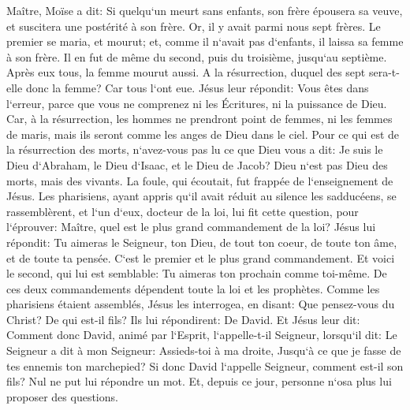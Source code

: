 \verse Maître, Moïse a dit: Si quelqu`un meurt sans enfants, son frère épousera sa veuve, et suscitera une postérité à son frère. 
\verse Or, il y avait parmi nous sept frères. Le premier se maria, et mourut; et, comme il n`avait pas d`enfants, il laissa sa femme à son frère. 
\verse Il en fut de même du second, puis du troisième, jusqu`au septième. 
\verse Après eux tous, la femme mourut aussi. 
\verse A la résurrection, duquel des sept sera-t-elle donc la femme? Car tous l`ont eue. 
\verse Jésus leur répondit: Vous êtes dans l`erreur, parce que vous ne comprenez ni les Écritures, ni la puissance de Dieu. 
\verse Car, à la résurrection, les hommes ne prendront point de femmes, ni les femmes de maris, mais ils seront comme les anges de Dieu dans le ciel. 
\verse Pour ce qui est de la résurrection des morts, n`avez-vous pas lu ce que Dieu vous a dit: 
\verse Je suis le Dieu d`Abraham, le Dieu d`Isaac, et le Dieu de Jacob? Dieu n`est pas Dieu des morts, mais des vivants. 
\verse La foule, qui écoutait, fut frappée de l`enseignement de Jésus. 
\verse Les pharisiens, ayant appris qu`il avait réduit au silence les sadducéens, se rassemblèrent, 
\verse et l`un d`eux, docteur de la loi, lui fit cette question, pour l`éprouver: 
\verse Maître, quel est le plus grand commandement de la loi? 
\verse Jésus lui répondit: Tu aimeras le Seigneur, ton Dieu, de tout ton coeur, de toute ton âme, et de toute ta pensée. 
\verse C`est le premier et le plus grand commandement. 
\verse Et voici le second, qui lui est semblable: Tu aimeras ton prochain comme toi-même. 
\verse De ces deux commandements dépendent toute la loi et les prophètes. 
\verse Comme les pharisiens étaient assemblés, Jésus les interrogea, 
\verse en disant: Que pensez-vous du Christ? De qui est-il fils? Ils lui répondirent: De David. 
\verse Et Jésus leur dit: Comment donc David, animé par l`Esprit, l`appelle-t-il Seigneur, lorsqu`il dit: 
\verse Le Seigneur a dit à mon Seigneur: Assieds-toi à ma droite, Jusqu`à ce que je fasse de tes ennemis ton marchepied? 
\verse Si donc David l`appelle Seigneur, comment est-il son fils? 
\verse Nul ne put lui répondre un mot. Et, depuis ce jour, personne n`osa plus lui proposer des questions. 

\chapter{}

